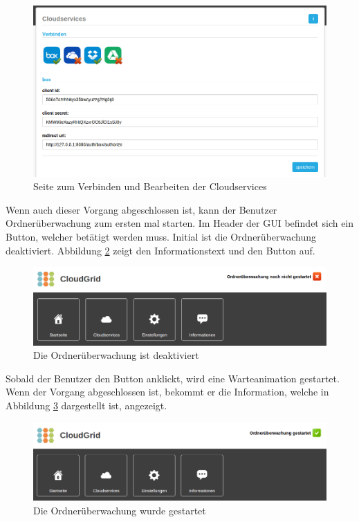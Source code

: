 \begin{figure}[H]
  \centering
  \includegraphics[scale=0.4]{resources/Bilder_Kapitel_6/cloudservices.png}
  \caption{Seite zum Verbinden und Bearbeiten der Cloudservices}
  \label{fig-demo-cloudservices}
\end{figure}

Wenn auch dieser Vorgang abgeschlossen ist, kann der Benutzer Ordnerüberwachung zum ersten mal starten.
Im Header der \ac{GUI} befindet sich ein Button, welcher betätigt werden muss.
Initial ist die Ordnerüberwachung deaktiviert.
Abbildung \ref{fig-demo-watchr-not-started} zeigt den Informationstext und den Button auf.

\begin{figure}[H]
  \centering
  \includegraphics[scale=0.4]{resources/Bilder_Kapitel_6/watchr_not_started.png}
  \caption{Die Ordnerüberwachung ist deaktiviert}
  \label{fig-demo-watchr-not-started}
\end{figure}

Sobald der Benutzer den Button anklickt, wird eine Warteanimation gestartet.
Wenn der Vorgang abgeschlossen ist, bekommt er die Information, welche in Abbildung \ref{fig-demo-watchr-started} dargestellt ist, angezeigt.

\begin{figure}[H]
  \centering
  \includegraphics[scale=0.4]{resources/Bilder_Kapitel_6/watchr_started.png}
  \caption{Die Ordnerüberwachung wurde gestartet}
  \label{fig-demo-watchr-started}
\end{figure}

